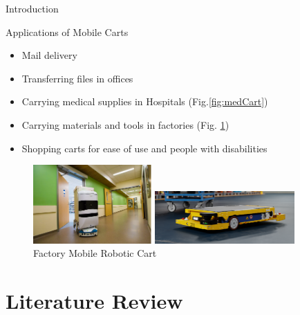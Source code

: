 \documentclass{beamer}
\begin{document}
\begin{frame}{Introduction}{}
  \begin{block}{Applications of Mobile Carts}
    \begin{itemize}
      \item Mail delivery
      \item Transferring files in offices
      \item Carrying medical supplies in Hospitals (Fig.\ref{fig:medCart})
      \item Carrying materials and tools in factories (Fig. \ref{fig:factCart})
      \item Shopping carts for ease of use and people with disabilities
    \end{itemize}
  \end{block}
      \begin{figure}
      \centering
      \begin{minipage}[t]{0.5\textwidth}
        \centering
        \includegraphics[height=3cm]{figs/img/MedicalRoboticCart}
        \caption{Medical Mobile Robotic Cart}
        \label{fig:medCart}
      \end{minipage}
      \begin{minipage}[t]{0.4\textwidth}
        \centering
        \includegraphics[height=2.0cm]{figs/img/FactoryRoboticCart}
        \caption{Factory Mobile Robotic Cart}
        \label{fig:factCart}
      \end{minipage}
    \end{figure}
\end{frame}


\section{Literature Review}
\end{document}
